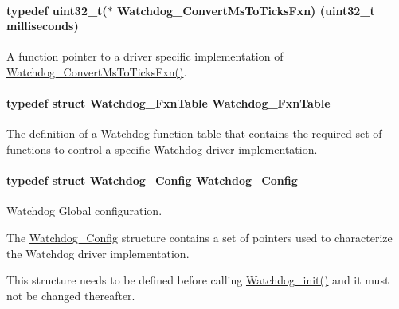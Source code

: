 \paragraph[{Watchdog\+\_\+\+Convert\+Ms\+To\+Ticks\+Fxn}]{\setlength{\rightskip}{0pt plus 5cm}typedef uint32\+\_\+t($\ast$ Watchdog\+\_\+\+Convert\+Ms\+To\+Ticks\+Fxn) (uint32\+\_\+t milliseconds)}\label{_watchdog_8h_aaf90926e5dc22cdca706b9aa86ee7580}


A function pointer to a driver specific implementation of \hyperlink{_watchdog_8h_aaf90926e5dc22cdca706b9aa86ee7580}{Watchdog\+\_\+\+Convert\+Ms\+To\+Ticks\+Fxn()}. 

\paragraph[{Watchdog\+\_\+\+Fxn\+Table}]{\setlength{\rightskip}{0pt plus 5cm}typedef struct {\bf Watchdog\+\_\+\+Fxn\+Table}  {\bf Watchdog\+\_\+\+Fxn\+Table}}\label{_watchdog_8h_ad3e804ec79af5e10e8ef3af301860ef5}


The definition of a Watchdog function table that contains the required set of functions to control a specific Watchdog driver implementation. 

\paragraph[{Watchdog\+\_\+\+Config}]{\setlength{\rightskip}{0pt plus 5cm}typedef struct {\bf Watchdog\+\_\+\+Config}  {\bf Watchdog\+\_\+\+Config}}\label{_watchdog_8h_ad8c9eb8a1cd2934965d385293fc38647}


Watchdog Global configuration. 

The \hyperlink{struct_watchdog___config}{Watchdog\+\_\+\+Config} structure contains a set of pointers used to characterize the Watchdog driver implementation.

This structure needs to be defined before calling \hyperlink{_watchdog_8h_afaadfb59be17661ae95562f2081355e7}{Watchdog\+\_\+init()} and it must not be changed thereafter.

